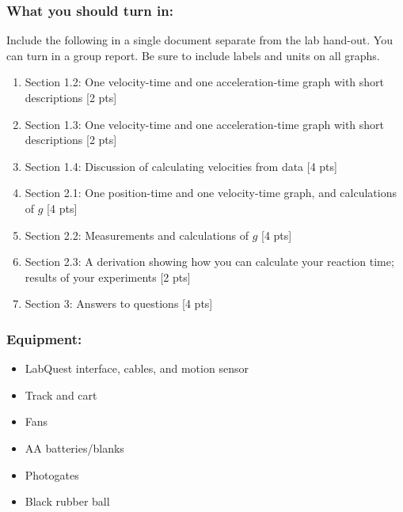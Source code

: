 \documentclass[11pt,letterpaper]{article}
\newcounter{question}[section]
\begin{document}
\subsubsection*{What you should turn in:}
Include the following in a single document separate from the lab hand-out. You can turn in a group report. Be sure to include labels and units on all graphs. 
\begin{enumerate}
\setlength{\parskip}{3pt}
\item Section 1.2: One velocity-time and one acceleration-time graph with short descriptions [2 pts]
\item Section 1.3: One velocity-time and one acceleration-time graph with short descriptions [2 pts]
\item Section 1.4: Discussion of calculating velocities from data [4 pts]
\item Section 2.1: One position-time and one velocity-time graph, and calculations of $g$ [4 pts]
\item Section 2.2: Measurements and calculations of $g$ [4 pts]
\item Section 2.3: A derivation showing how you can calculate your reaction time; results of your experiments [2 pts]
\item Section 3: Answers to questions [4 pts]
\end{enumerate}

\subsubsection*{Equipment:}
\begin{itemize}
\setlength{\parskip}{3pt}
\item LabQuest interface, cables, and motion sensor
\item Track and cart
\item Fans
\item AA batteries/blanks
\item Photogates
\item Black rubber ball
\end{itemize}
\end{document}
